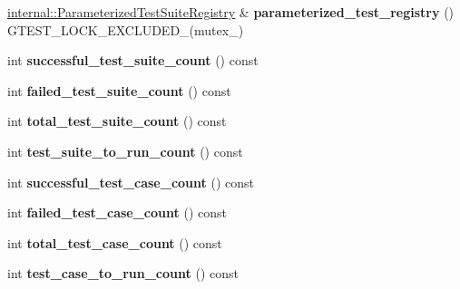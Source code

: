 \begin{DoxyCompactItemize}
\mbox{\label{classtesting_1_1UnitTest_a9db8831a87fddaf3e34d5a30a40dd624}} 
\mbox{\hyperlink{classtesting_1_1internal_1_1ParameterizedTestSuiteRegistry}{internal\+::\+Parameterized\+Test\+Suite\+Registry}} \& {\bfseries parameterized\+\_\+test\+\_\+registry} () G\+T\+E\+S\+T\+\_\+\+L\+O\+C\+K\+\_\+\+E\+X\+C\+L\+U\+D\+E\+D\+\_\+(mutex\+\_\+)
\item 
\mbox{\label{classtesting_1_1UnitTest_aefa4c6654fed9a70c6c5ca61abae2234}} 
int {\bfseries successful\+\_\+test\+\_\+suite\+\_\+count} () const
\item 
\mbox{\label{classtesting_1_1UnitTest_a118a74c8cc3845653893ed17245f44ac}} 
int {\bfseries failed\+\_\+test\+\_\+suite\+\_\+count} () const
\item 
\mbox{\label{classtesting_1_1UnitTest_af8ed6d43a95405a860fdd898bf0c1a87}} 
int {\bfseries total\+\_\+test\+\_\+suite\+\_\+count} () const
\item 
\mbox{\label{classtesting_1_1UnitTest_ade4726c8283513bd2b3391c600503790}} 
int {\bfseries test\+\_\+suite\+\_\+to\+\_\+run\+\_\+count} () const
\item 
\mbox{\label{classtesting_1_1UnitTest_acaa2ab71f53c25ffe0242a91c14e173f}} 
int {\bfseries successful\+\_\+test\+\_\+case\+\_\+count} () const
\item 
\mbox{\label{classtesting_1_1UnitTest_abc0fa297a4103f7cdd9627ae27d9d0ef}} 
int {\bfseries failed\+\_\+test\+\_\+case\+\_\+count} () const
\item 
\mbox{\label{classtesting_1_1UnitTest_a93fc8f4eebc3212d06468ad216830ced}} 
int {\bfseries total\+\_\+test\+\_\+case\+\_\+count} () const
\item 
\mbox{\label{classtesting_1_1UnitTest_a965248fbe72f9fede5de921b6666943b}} 
int {\bfseries test\+\_\+case\+\_\+to\+\_\+run\+\_\+count} () const
\item 
\mbox{\label{classtesting_1_1UnitTest_a49ee8056e357ad497e67399447dd5a40}} 

\end{DoxyCompactItemize}
